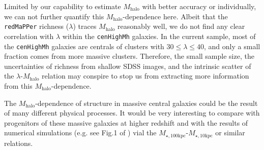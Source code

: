\documentclass{emulateapj}
\def\redm{\texttt{redMaPPer}}
\def\rbcg{\texttt{cenHighMh}}
\def\mhalo{{$M_{\mathrm{halo}}$}}
\def\minn{{$M_{\star,10\mathrm{kpc}}$}}
\def\mtot{{$M_{\star,100\mathrm{kpc}}$}}
\newcommand{\update}[1]{\textcolor{Bittersweet}{#1}}
\begin{document}
\begin{CJK*}{UTF8}{gbsn}
    \update{
    Limited by our capability to estimate \mhalo{} with better accuracy or individually, 
    we can not further quantify this \mhalo{}-dependence here.
    Albeit that the \redm{} richness ($\lambda$) traces \mhalo{} reasonably well, 
    we do not find any clear correlation with $\lambda$ within the \rbcg{} galaxies.
    }
    In the current sample, most of the \rbcg{} galaxies are centrals of clusters with 
    $30 \leq \lambda \leq 40$, and only a small fraction comes from more massive clusters.  
    Therefore, the small sample size, the uncertainties of richness from shallow SDSS
    images, and the intrinsic scatter of the $\lambda$-\mhalo{} relation may conspire to 
    stop us from extracting more information from this \mhalo{}-dependence.
    
    \update{
    The \mhalo{}-dependence of structure in massive central galaxies could be the result 
    of many different physical processes. 
    It would be very interesting to compare with progenitors of these massive 
    galaxies at higher redshift and with the results of numerical simulations (e.g. see 
    Fig.1 of \citealt{Wellons2016b}) vial the \mtot{}-\minn{} or similar relations.
    }
     



\end{CJK*}
\end{document}

